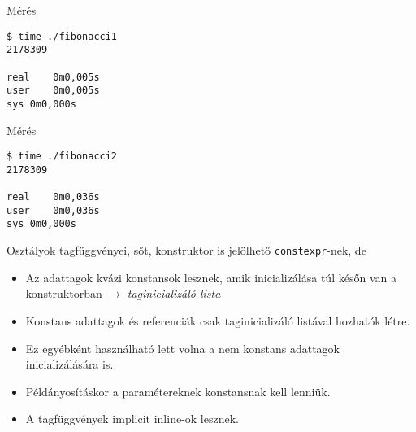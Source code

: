 \begin{frame}[fragile]
    \begin{exampleblock}{}
        \scriptsize
        \vspace{-.2cm}
        
        \vspace{-.2cm}
    \end{exampleblock}
    \begin{block}{Mérés}
        \vspace{-.4cm}
        \scriptsize
        \begin{verbatim}
$ time ./fibonacci1
2178309

real	0m0,005s
user	0m0,005s
sys	0m0,000s    
\end{verbatim}
        \vspace{-.4cm}
    \end{block}
\end{frame}

\begin{frame}[fragile]
    \begin{exampleblock}{}
        \scriptsize
        \vspace{-.2cm}
        
        \vspace{-.2cm}
    \end{exampleblock}
    \begin{block}{Mérés}
        \vspace{-.4cm}
        \scriptsize
        \begin{verbatim}
$ time ./fibonacci2
2178309

real	0m0,036s
user	0m0,036s
sys	0m0,000s            
\end{verbatim}
        \vspace{-.4cm}
    \end{block}
\end{frame}

\begin{frame}
    Osztályok tagfüggvényei, sőt, konstruktor is jelölhető \texttt{constexpr}-nek, de
    \begin{itemize}
        \item Az adattagok kvázi konstansok lesznek, amik inicializálása túl későn van a konstruktorban $\to$ \emph{taginicializáló lista}
        \item Konstans adattagok és referenciák csak taginicializáló listával hozhatók létre.
        \item Ez egyébként használható lett volna a nem konstans adattagok inicializálására is.
        \item Példányosításkor a paramétereknek konstansnak kell lenniük.
        \item A tagfüggvények implicit inline-ok lesznek.
    \end{itemize}
\end{frame}

